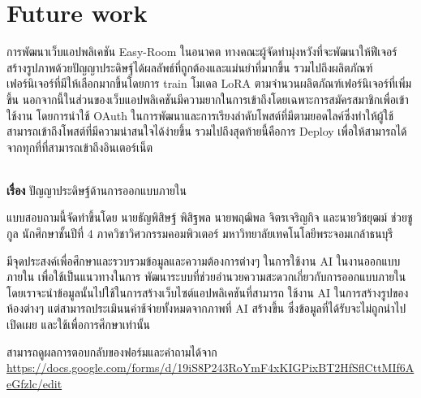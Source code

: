 \documentclass[12pt,oneside,openright,a4paper]{cpe-thai-project}
\begin{document}
\section{Future work}
\hspace{18pt}การพัฒนาเว็บแอปพลิเคชัน Easy-Room ในอนาคต ทางคณะผู้จัดทำมุ่งหวังที่จะพัฒนาให้ฟีเจอร์สร้างรูปภาพด้วยปัญญาประดิษฐ์ได้ผลลัพธ์ที่ถูกต้องและแม่นยำที่มากขึ้น รวมไปถึงผลิตภัณฑ์เฟอร์นิเจอร์ที่มีให้เลือกมากขึ้นโดยการ train โมเดล LoRA ตามจำนวนผลิตภัณฑ์เฟอร์นิเจอร์ที่เพิ่มขึ้น นอกจากนี้ในส่วนของเว็บแอปพลิเคชันมีความยากในการเข้าถึงโดยเฉพาะการสมัครสมาชิกเพื่อเข้าใช้งาน โดยการนำใช้ OAuth ในการพัฒนาและการเรียงลำดับโพสต์ที่มีตามยอดไลค์ซึ่งทำให้ผู้ใช้สามารถเข้าถึงโพสต์ที่มีความน่าสนใจได้ง่ายขึ้น รวมไปถึงสุดท้ายนี้คือการ Deploy เพื่อให้สามารถได้จากทุกที่ที่สามารถเข้าถึงอินเตอร์เน็ต




\makeatletter
\g@addto@macro{\UrlBreaks}{\UrlOrds}
\makeatother
% 




 \\

\textbf{เรื่อง} ปัญญาประดิษฐ์ด้านการออกแบบภายใน

\hspace {18pt} แบบสอบถามนี้จัดทำขึ้นโดย นายธัญพิสิษฐ์ พิสิฐพล นายพฤฒิพล จิตรเจริญกิจ และนายวิชยุฒม์
ช่วยชูกูล นักศึกษาชั้นปีที่ 4 ภาควิชาวิศวกรรมคอมพิวเตอร์ มหาวิทยาลัยเทคโนโลยีพระจอมเกล้าธนบุรี

\hspace {18pt}มีจุดประสงค์เพื่อศึกษาและรวบรวมข้อมูลและความต้องการต่างๆ ในการใช้งาน AI ในงานออกแบบภายใน เพื่อใช้เป็นแนวทางในการ
พัฒนาระบบที่ช่วยอํานวยความสะดวกเกี่ยวกับการออกแบบภายใน โดยเราจะนําข้อมูลนั้นไปใช้ในการสร้างเว็บไซต์แอปพลิเคชันที่สามารถ
ใช้งาน AI ในการสร้างรูปของห้องต่างๆ แต่สามารถประเมินนค่าช้จ่ายทั้งหมดจากภาพที่ AI สร้างขึ้น ซึ่งข้อมูลที่ได้รับจะไม่ถูกนําไปเปิดเผย
และใช้เพื่อการศีกษาเท่านั้น

\hspace {18pt} สามารถดูผลการตอบกลับของฟอร์มและคำถามได้จาก \url{https://docs.google.com/forms/d/19iS8P243RoYmF4xKIGPixBT2HfSflCttMIf6AeGfzlc/edit}

 \\
\end{document}
